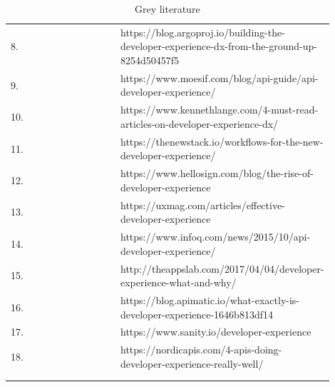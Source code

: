 \documentclass[english, 12pt, a4paper, sci, utf8, a-1b, online]{aaltothesis}
\begin{document}
\begin{center}
\begin{longtable}{p{0.05\linewidth}p{0.35\linewidth}p{0.5\linewidth}}
    8.  & \textcite{building-the-developer-experience-from-the-ground-up} & https://blog.argoproj.io/building-the-developer-experience-dx-from-the-ground-up-8254d50457f5                            \\
    9.  & \textcite{api-developer-experience-dx-resources}                & https://www.moesif.com/blog/api-guide/api-developer-experience/                                                          \\
    10. & \textcite{4-must-read-articles-on-developer-experience}         & https://www.kennethlange.com/4-must-read-articles-on-developer-experience-dx/                                            \\
    11. & \textcite{workflows-for-the-new-developer-experience}           & https://thenewstack.io/workflows-for-the-new-developer-experience/                                                       \\
    12. & \textcite{apis-for-humans-the-rise-of-developer-experience}     & https://www.hellosign.com/blog/the-rise-of-developer-experience                                                          \\
    13. & \textcite{effective-developer-experience}                       & https://uxmag.com/articles/effective-developer-experience                                                                \\
    14. & \textcite{what-is-api-developer-experience-and-why-it-matters}  & https://www.infoq.com/news/2015/10/api-developer-experience/                                                             \\
    15. & \textcite{developer-experience-what-and-why}                    & http://theappslab.com/2017/04/04/developer-experience-what-and-why/                                                      \\
    16. & \textcite{what-exactly-is-developer-experience}                 & https://blog.apimatic.io/what-exactly-is-developer-experience-1646b813df14                                               \\
    17. & \textcite{developer-experience-sanity}                          & https://www.sanity.io/developer-experience                                                                               \\
    18. & \textcite{4-apis-doing-developer-experience-really-well}        & https://nordicapis.com/4-apis-doing-developer-experience-really-well/                                                    \\
    \captionsetup{width=0.6\textwidth}                                                                                                                                                               \\
    \caption{Grey literature}                                                                                                                                                                        \\
  \end{longtable}
\end{center}
\end{document}
